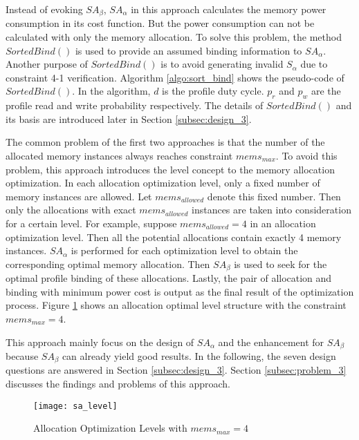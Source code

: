 	Instead of evoking $SA_{\beta}$, $SA_{\alpha}$ in this approach calculates
	the memory power consumption in its cost function.
	But the power consumption can not be calculated with only the memory
	allocation.
	To solve this problem, the method $SortedBind()$ is used to
	provide an assumed binding information to $SA_{\alpha}$.
	Another purpose of $SortedBind()$ is to avoid generating invalid $S_{\alpha}$
	due to constraint 4-1 verification.
	Algorithm \ref{algo:sort_bind} shows the pseudo-code of $SortedBind()$.
	In the algorithm, $d$ is the profile duty cycle.
	$p_{r}$ and $p_{w}$ are the profile read and write probability respectively.
	The details of $SortedBind()$ and its basis are introduced later in Section
	\ref{subsec:design_3}.
	
	
	The common problem of the first two approaches
	is that the number of the allocated memory instances always reaches constraint
	$mems_{max}$.
	To avoid this problem, this approach introduces the level concept to the memory
	allocation optimization. In each allocation optimization level, only a fixed
	number of memory instances are allowed. Let $mems_{allowed}$ denote this fixed
	number. Then only the allocations with exact $mems_{allowed}$ instances are
	taken into consideration for a certain level.
	For example, suppose $mems_{allowed}=4$ in an allocation optimization level.
	Then all the potential allocations contain exactly 4 memory instances.
	$SA_{\alpha}$ is performed for each optimization level to obtain the corresponding
	optimal memory allocation. Then $SA_{\beta}$ is used to seek for the optimal
	profile binding of these allocations. Lastly, the pair of allocation and binding
	with minimum power cost is output as the final result of the optimization process.
	Figure \ref{fig:sa_level} shows an allocation optimal level structure with the
	constraint $mems_{max}=4$.
	
	This approach mainly focus on the design of $SA_{\alpha}$ and the enhancement
	for $SA_{\beta}$ because $SA_{\beta}$ can already yield good results.
	In the following, the seven design questions are answered in Section
	\ref{subsec:design_3}. Section \ref{subsec:problem_3} discusses the findings
	and problems of this approach.
	\begin{figure}[h]
		\begin{center}
			\texttt{[image: sa\_level]}
			\caption{Allocation Optimization Levels with $mems_{max}=4$}
			\label{fig:sa_level}
		\end{center}
	\end{figure}

